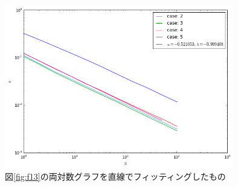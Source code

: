 \begin{figure}[H]
    \begin{center}
        \includegraphics[width=10cm]{../img/simple3_N_2_fit.png}
        \caption{図\ref{fig:f13}の両対数グラフを直線でフィッティングしたもの}
        \label{fig:f14}
    \end{center}
\end{figure}


